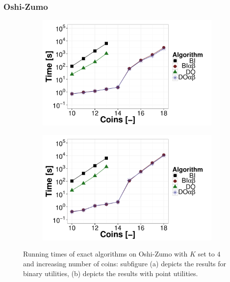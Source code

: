 \subsubsection{Oshi-Zumo}
\begin{figure}
\centering
	\begin{subfigure}{0.49\textwidth}
		\includegraphics[width=1\textwidth]{figures/OZ-K4.pdf}\caption{}\label{fig:off:res:oz4}
	\end{subfigure}
	\begin{subfigure}{0.49\textwidth}
		\includegraphics[width=1\textwidth]{figures/OZ-K4-BF.pdf}\caption{}\label{fig:off:res:oz4-bf}
	\end{subfigure}
\caption{Running times of exact algorithms on Oshi-Zumo with $K$ set to $4$ and increasing number of coins: subfigure (a) depicts the results for binary utilities, (b) depicts the results with point utilities.} \label{fig:off:res:oz}
\end{figure}

